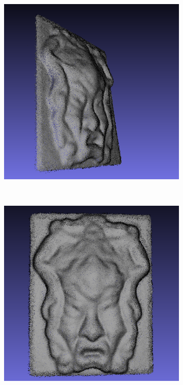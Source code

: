 \documentclass[letterpaper, 10 pt, conference]{ieeeconf}  %
\begin{document}
\begin{figure}[t]
        \centering
        \begin{subfigure}[b]{0.45\linewidth}
                \centering
                \includegraphics[width=\linewidth]{../models/gorgon_gray_model1.png}
                \caption{}
        \end{subfigure}%
        ~ %
        \begin{subfigure}[b]{0.45\linewidth}
                \centering
                \includegraphics[width=\linewidth]{../models/gorgon_gray_model.png}

\end{subfigure}
\end{figure}
\end{document}
